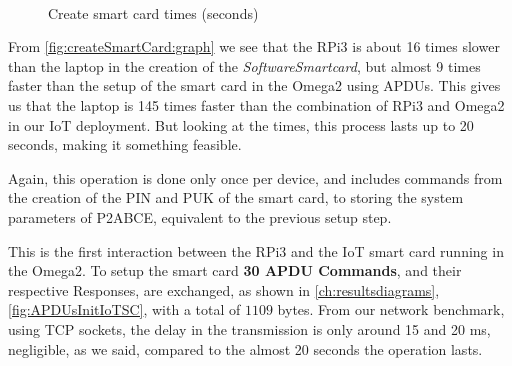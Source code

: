 \begin{figure}[bth]
	\myfloatalign
	 \quad
	 \\
	\caption{Create smart card times (seconds)}
	\label{fig:createSmartCard:graph}
\end{figure}

From \autoref{fig:createSmartCard:graph} we see that the RPi3 is about 16 times slower than the laptop in the creation of the \textit{SoftwareSmartcard}, but almost 9 times faster than the setup of the smart card in the Omega2 using APDUs. This gives us that the laptop is 145 times faster than the combination of RPi3 and Omega2 in our IoT deployment.
But looking at the times, this process lasts up to 20 seconds, making it something feasible.

Again, this operation is done only once per device, and includes commands from the creation of the PIN and PUK of the smart card, to storing the system parameters of P2ABCE, equivalent to the previous setup step.



This is the first interaction between the RPi3 and the IoT smart card running in the Omega2. To setup the smart card \textbf{30 APDU Commands}, and their respective Responses, are exchanged, as shown in \autoref{ch:resultsdiagrams}, \autoref{fig:APDUsInitIoTSC}, with a total of $1109$ bytes. From our network benchmark, using TCP sockets, the delay in the transmission is only around 15 and 20 ms, negligible, as we said, compared to the almost 20 seconds the operation lasts.


